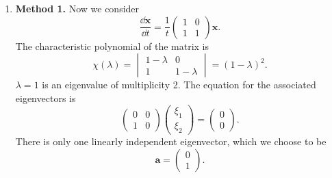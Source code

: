 {\begin{Solution}
\begin{enumerate}
    Note that the change of independent variable $\tau = \log t$, 
    $\mathbf{y}(\tau) = \mathbf{x}(t)$, will transform (\ref{eulersystem}) into a constant
    coefficient system.
    \[
    \frac{\dd \mathbf{y}}{\dd \tau} = \mathbf{A} \mathbf{y}
    \]
    Thus all the methods for solving constant coefficient systems carry over
    directly to solving (\ref{eulersystem}).  In the case of eigenvalues with
    multiplicity greater than one, we will have solutions of the form,
    \[
    \boldsymbol{\xi} t^\alpha, \quad 
    \boldsymbol{\xi} t^\alpha \log t + \boldsymbol{\eta} t^\alpha, \quad
    \boldsymbol{\xi} t^\alpha \left(\log t \right)^2 + \boldsymbol{\eta} t^\alpha \log t 
    + \boldsymbol{\zeta} t^\alpha, \quad
    \ldots,
    \]
    analogous to the form of the solutions for a constant coefficient system,
    \[
    \boldsymbol{\xi} \e^{\alpha \tau}, \quad 
    \boldsymbol{\xi} \tau \e^{\alpha \tau} + \boldsymbol{\eta} \e^{\alpha \tau}, \quad
    \boldsymbol{\xi} \tau^2 \e^{\alpha \tau} + \boldsymbol{\eta} \tau \e^{\alpha \tau}
    + \boldsymbol{\zeta} \e^{\alpha \tau}, \quad
    \ldots.
    \]
  \item
    \textbf{Method 1.}
    Now we consider
    \[
    \frac{\dd \mathbf{x}}{\dd t} = \frac{1}{t} 
    \begin{pmatrix}
      1 & 0 \\
      1 & 1
    \end{pmatrix}
    \mathbf{x}.
    \]
    The characteristic polynomial of the matrix is
    \[
    \chi(\lambda) 
    = \begin{vmatrix} 1 - \lambda & 0 \\ 1 & 1 - \lambda \end{vmatrix}
    = (1 - \lambda)^2.
    \]
    $\lambda = 1$ is an eigenvalue of multiplicity 2.  The equation for the 
    associated eigenvectors is
    \[
    \begin{pmatrix}
      0 & 0 \\
      1 & 0
    \end{pmatrix}
    \begin{pmatrix} \xi_1 \\ \xi_2 \end{pmatrix} = 
    \begin{pmatrix} 0 \\ 0 \end{pmatrix}.
    \] 
    There is only one linearly independent eigenvector, which we choose to be
    \[
    \mathbf{a} = \begin{pmatrix} 0 \\ 1 \end{pmatrix}.
\]
\end{enumerate}
\end{Solution}}
